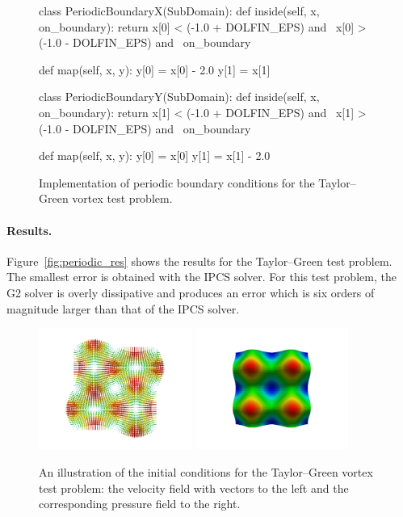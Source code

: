 \begin{figure}
  \begin{center}
    \begin{python}
class PeriodicBoundaryX(SubDomain):
    def inside(self, x, on_boundary):
        return x[0] < (-1.0 + DOLFIN_EPS) and \
               x[0] > (-1.0 - DOLFIN_EPS) and \
               on_boundary

    def map(self, x, y):
        y[0] = x[0] - 2.0
        y[1] = x[1]

class PeriodicBoundaryY(SubDomain):
    def inside(self, x, on_boundary):
        return x[1] < (-1.0 + DOLFIN_EPS) and \
               x[1] > (-1.0 - DOLFIN_EPS) and \
               on_boundary

    def map(self, x, y):
        y[0] = x[0]
        y[1] = x[1] - 2.0
    \end{python}
    \caption{Implementation of periodic boundary conditions for the
      Taylor--Green vortex test problem.}
    \label{fig:periodic_bcs}
  \end{center}
\end{figure}

\paragraph{Results.}

Figure~\ref{fig:periodic_res} shows the results for the Taylor--Green
test problem. The smallest error is obtained with the IPCS solver. For
this test problem, the G2 solver is overly dissipative and produces an
error which is six orders of magnitude larger than that of the IPCS
solver.

\begin{figure}
  \center
  \includegraphics[width=5cm]{chapters/kvs-1/pdf/periodic_v.pdf}
  \includegraphics[width=5cm]{chapters/kvs-1/pdf/periodic_p.pdf}
  \caption{An illustration of the initial conditions for the
    Taylor--Green vortex test problem: the velocity field with
    vectors to the left and the corresponding pressure field to the
    right.}
  \label{fig:periodic}
\end{figure}

